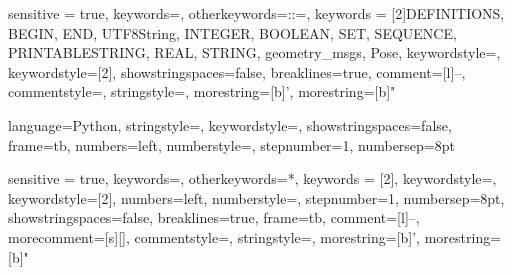 \newcommand{\ros}[1]{\lstinline[language=ROS]{#1}}



{
	sensitive = true,
	keywords={},
	otherkeywords={::=},%
  	keywords = [2]{DEFINITIONS, BEGIN, END, UTF8String, INTEGER, BOOLEAN, SET, SEQUENCE, PRINTABLESTRING, REAL, STRING, geometry_msgs, Pose},
  	keywordstyle=\color{ros_keyword},
  	keywordstyle=[2]\color{ros_string},%
  	showstringspaces=false,
  	breaklines=true,
  	comment=[l]{--},
  	commentstyle=\color{aadl_comment_green}\ttfamily,
  	stringstyle=\color{red}\ttfamily,
  	morestring=[b]',
  	morestring=[b]"
}

\newcommand{\asn}[1]{\lstinline[language=ASN1]{#1}}


\lstdefinelanguage{{}}
{
	language=Python,
    stringstyle=\color{black},
    keywordstyle=\color{darkblue},
    showstringspaces=false,
    frame=tb,
    numbers=left,
    numberstyle=\scriptsize,
    stepnumber=1,
    numbersep=8pt
}

\newcommand{\py}[1]{\lstinline[language=Pythone]{#1}}


{
	sensitive = true,
	keywords={},
	otherkeywords={*},%
  	keywords = [2]{},
  	keywordstyle=\color{darkblue},
  	keywordstyle=[2]\color{ros_string},%
  	numbers=left,
  	numberstyle=\scriptsize,
  	stepnumber=1,
  	numbersep=8pt,
  	showstringspaces=false,
  	breaklines=true,
  	frame=tb,
  	comment=[l]{--},
  	morecomment=[s]{[}{]},
  	commentstyle=\color{darkblue}\ttfamily,
  	stringstyle=\color{red}\ttfamily,
  	morestring=[b]',
  	morestring=[b]"
}




